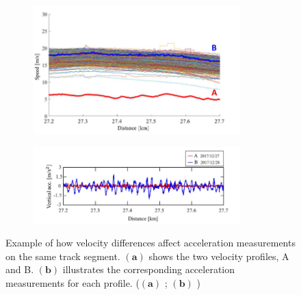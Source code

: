 \begin{figure}[H]
    \centering
    \begin{subfigure}{0.45\textwidth}
        \includegraphics[width=8cm]{Cap2_LitReview/Vel_effect/vel_profiles.png}
        \caption{}
        \label{fig:vel_effect_ono-a}
    \end{subfigure}
    \hspace{0.3cm}
    \begin{subfigure}{0.45\textwidth}
        \includegraphics[width=8cm]{Cap2_LitReview/Vel_effect/accel_measurements.png}
        \caption{}
        \label{fig:vel_effect_ono-b}
    \end{subfigure}
    \caption{Example of how velocity differences affect acceleration measurements on the same track segment. $\boldsymbol{(a)}$ shows the two velocity profiles, A and B. $\boldsymbol{(b)}$ illustrates the corresponding acceleration measurements for each profile. ($\boldsymbol{(a)}$ \cite{Hironori_ONO202322-00239}; $\boldsymbol{(b)}$ \cite{Hironori_ONO202322-00239})}
    \label{fig:vel_effect_ono}
\end{figure}

